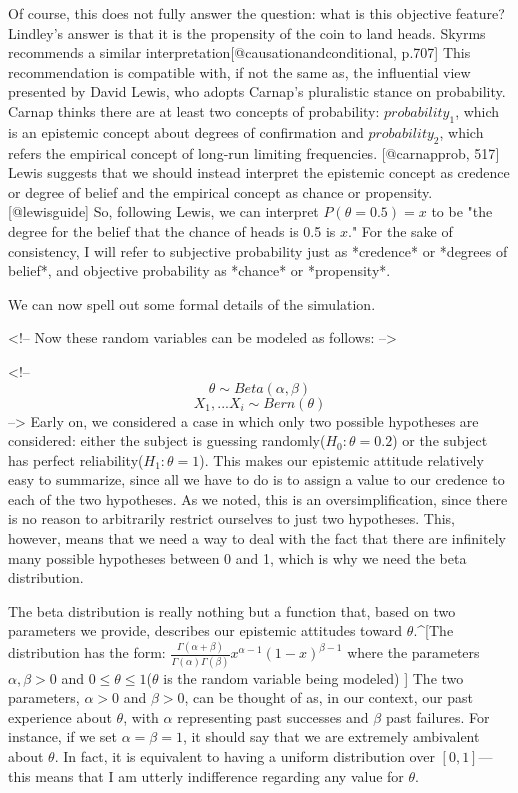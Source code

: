Of course, this does not fully answer the question: what is this
objective feature? Lindley's answer is that it is the propensity of the
coin to land heads. Skyrms recommends a similar
interpretation{[}@causationandconditional, p.707{]} This recommendation
is compatible with, if not the same as, the influential view presented
by David Lewis, who adopts Carnap's pluralistic stance on probability.
Carnap thinks there are at least two concepts of probability:
\(probability_1\), which is an epistemic concept about degrees of
confirmation and \(probability_2\), which refers the empirical concept
of long-run limiting frequencies. {[}@carnapprob, 517{]} Lewis suggests
that we should instead interpret the epistemic concept as credence or
degree of belief and the empirical concept as chance or
propensity.{[}@lewisguide{]} So, following Lewis, we can interpret
\(P(\theta=0.5)=x\) to be "the degree for the belief that the chance of
heads is 0.5 is \(x\)." For the sake of consistency, I will refer to
subjective probability just as *credence* or *degrees of belief*, and
objective probability as *chance* or *propensity*.

We can now spell out some formal details of the simulation.

\textless{}!-- Now these random variables can be modeled as follows:
--\textgreater{}

\textless{}!-- \[\theta \sim Beta(\alpha, \beta)\]
\[X_1,...X_i \sim Bern(\theta)\] --\textgreater{} Early on, we
considered a case in which only two possible hypotheses are considered:
either the subject is guessing randomly(\(H_0:\theta = 0.2\)) or the
subject has perfect reliability(\(H_1:\theta = 1\)). This makes our
epistemic attitude relatively easy to summarize, since all we have to do
is to assign a value to our credence to each of the two hypotheses. As
we noted, this is an oversimplification, since there is no reason to
arbitrarily restrict ourselves to just two hypotheses. This, however,
means that we need a way to deal with the fact that there are infinitely
many possible hypotheses between 0 and 1, which is why we need the beta
distribution.

The beta distribution is really nothing but a function that, based on
two parameters we provide, describes our epistemic attitudes toward
\(\theta\).\^{}{[}The distribution has the form:
\(\frac{\Gamma(\alpha + \beta)}{\Gamma(\alpha)\Gamma(\beta)}x^{\alpha -1} (1-x)^{\beta -1}\)
where the parameters \(\alpha,\beta > 0\) and
\(0\leq \theta \leq 1\)(\(\theta\) is the random variable being modeled)
{]} The two parameters, \(\alpha>0\) and \(\beta>0\), can be thought of
as, in our context, our past experience about \(\theta\), with
\(\alpha\) representing past successes and \(\beta\) past failures. For
instance, if we set \(\alpha = \beta = 1\), it should say that we are
extremely ambivalent about \(\theta\). In fact, it is equivalent to
having a uniform distribution over \([0,1]\)---this means that I am
utterly indifference regarding any value for \(\theta\).

